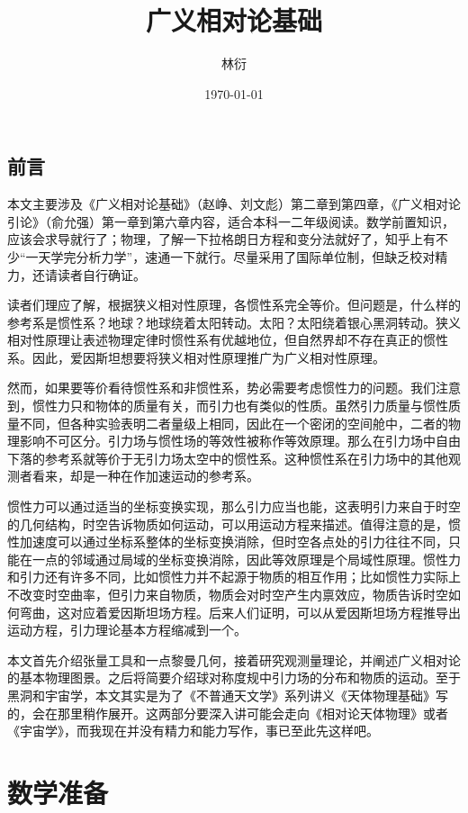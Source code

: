 \documentclass[UTF8, 12pt, a4paper, oneside, onecolumn, fontset=none]{ctexart}
\title{广义相对论基础}
\author{林衍}
\date{\today}
\begin{document}
\maketitle
\subsection*{前言}
本文主要涉及《广义相对论基础》（赵峥、刘文彪）第二章到第四章，《广义相对论引论》（俞允强）第一章到第六章内容，适合本科一二年级阅读。数学前置知识，应该会求导就行了；物理，了解一下拉格朗日方程和变分法就好了，知乎上有不少“一天学完分析力学”，速通一下就行。尽量采用了国际单位制，但缺乏校对精力，还请读者自行确证。

读者们理应了解，根据狭义相对性原理，各惯性系完全等价。但问题是，什么样的参考系是惯性系？地球？地球绕着太阳转动。太阳？太阳绕着银心黑洞转动。狭义相对性原理让表述物理定律时惯性系有优越地位，但自然界却不存在真正的惯性系。因此，爱因斯坦想要将狭义相对性原理推广为广义相对性原理。

然而，如果要等价看待惯性系和非惯性系，势必需要考虑惯性力的问题。我们注意到，惯性力只和物体的质量有关，而引力也有类似的性质。虽然引力质量与惯性质量不同，但各种实验表明二者量级上相同，因此在一个密闭的空间舱中，二者的物理影响不可区分。引力场与惯性场的等效性被称作等效原理。那么在引力场中自由下落的参考系就等价于无引力场太空中的惯性系。这种惯性系在引力场中的其他观测者看来，却是一种在作加速运动的参考系。

惯性力可以通过适当的坐标变换实现，那么引力应当也能，这表明引力来自于时空的几何结构，时空告诉物质如何运动，可以用运动方程来描述。值得注意的是，惯性加速度可以通过坐标系整体的坐标变换消除，但时空各点处的引力往往不同，只能在一点的邻域通过局域的坐标变换消除，因此等效原理是个局域性原理。惯性力和引力还有许多不同，比如惯性力并不起源于物质的相互作用；比如惯性力实际上不改变时空曲率，但引力来自物质，物质会对时空产生内禀效应，物质告诉时空如何弯曲，这对应着爱因斯坦场方程。后来人们证明，可以从爱因斯坦场方程推导出运动方程，引力理论基本方程缩减到一个。

本文首先介绍张量工具和一点黎曼几何，接着研究观测量理论，并阐述广义相对论的基本物理图景。之后将简要介绍球对称度规中引力场的分布和物质的运动。至于黑洞和宇宙学，本文其实是为了《不普通天文学》系列讲义《天体物理基础》写的，会在那里稍作展开。这两部分要深入讲可能会走向《相对论天体物理》或者《宇宙学》，而我现在并没有精力和能力写作，事已至此先这样吧。

\newpage
\tableofcontents

\newpage
\section{数学准备}
\end{document}
